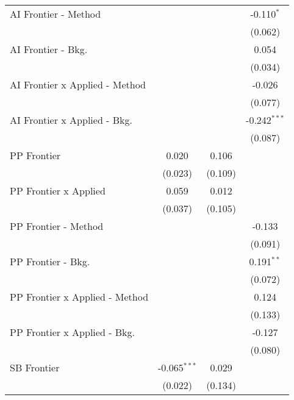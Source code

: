 \begin{tabular}{lccc}
   AI Frontier - Method           &                &                & -0.110$^{*}$\\   
                                  &                &                & (0.062)\\   
   AI Frontier - Bkg.             &                &                & 0.054\\   
                                  &                &                & (0.034)\\   
   AI Frontier x Applied - Method &                &                & -0.026\\   
                                  &                &                & (0.077)\\   
   AI Frontier x Applied - Bkg.   &                &                & -0.242$^{***}$\\   
                                  &                &                & (0.087)\\   
   PP Frontier                    & 0.020          & 0.106          &   \\   
                                  & (0.023)        & (0.109)        &   \\   
   PP Frontier x Applied          & 0.059          & 0.012          &   \\   
                                  & (0.037)        & (0.105)        &   \\   
   PP Frontier - Method           &                &                & -0.133\\   
                                  &                &                & (0.091)\\   
   PP Frontier - Bkg.             &                &                & 0.191$^{**}$\\   
                                  &                &                & (0.072)\\   
   PP Frontier x Applied - Method &                &                & 0.124\\   
                                  &                &                & (0.133)\\   
   PP Frontier x Applied - Bkg.   &                &                & -0.127\\   
                                  &                &                & (0.080)\\   
   SB Frontier                    & -0.065$^{***}$ & 0.029          &   \\   
                                  & (0.022)        & (0.134)        &   \\   

\end{tabular}
